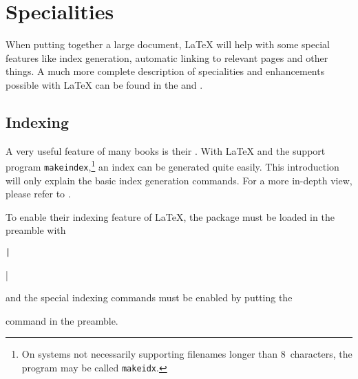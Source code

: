 %
%
%
%


\chapter{Specialities}\label{specialities}
\begin{intro}
  When putting together a large document, \LaTeX{} will help with some special
  features like index generation, automatic linking to relevant pages and other
  things. A much more complete description of specialities and enhancements
  possible with \LaTeX{} can be found in the {\normalfont\manual{}} and
    {\normalfont\companion}.
\end{intro}

\section{Indexing}\label{sec:indexing}
A very useful feature of many books is their . With \LaTeX{}
and the support program \texttt{makeindex},\footnote{On systems not
  necessarily supporting
  filenames longer than 8~characters, the program may be called
  \texttt{makeidx}.} an index can be generated quite easily.  This
introduction will only explain the basic index generation commands.
For a more in-depth view, please refer to \companion.

To enable their indexing feature of \LaTeX{}, the  package
must be loaded in the preamble with
\begin{lscommand}
  \texttt|\usepackage{makeidx}|
\end{lscommand}
\noindent and the special indexing commands must be enabled by putting
the
\begin{lscommand}
\end{lscommand}
\noindent command in the preamble.

